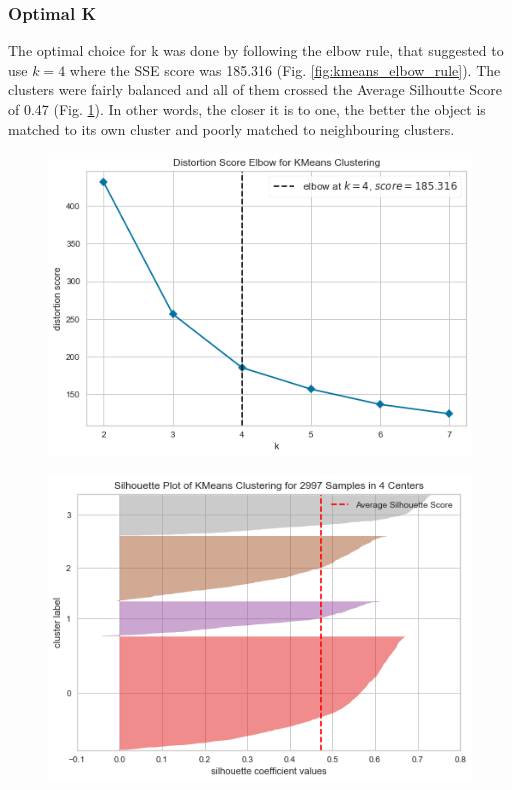 \documentclass{article}
\begin{document}
\subsubsection{Optimal K}
The optimal choice for k was done by following the elbow rule, that suggested to use $k=4$ where the SSE score was 185.316 (Fig. \ref{fig:kmeans_elbow_rule}). The clusters were fairly balanced and all of them crossed the Average Silhoutte Score of 0.47 (Fig. \ref{fig:kmeans_silhouette_score}). In other words, the closer it is to one, the better the object is matched to its own cluster and poorly matched to neighbouring clusters.


\begin{figure}[!h]
\centering
\begin{minipage}{.5\textwidth}
\centering
\includegraphics[width=\textwidth]{plots/kmeans/kmeans_elbow_rule}
\label{fig:kmeans_elbow_rule}
\end{minipage}%
\begin{minipage}{.5\textwidth}
\centering
\includegraphics[width=\textwidth]{plots/kmeans/kmeans_silhouette_score}
\label{fig:kmeans_silhouette_score}
\end{minipage}
\end{figure}
\end{document}

